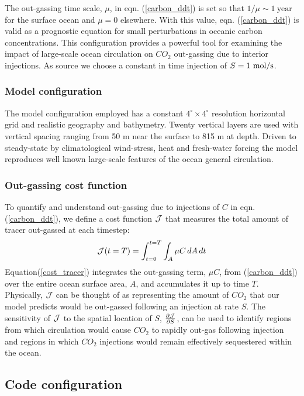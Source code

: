 The out-gassing time scale, $\mu$, in eqn. (\ref{carbon_ddt})
is set so that \( 1/\mu \sim 1 \ \mathrm{year} \) for the surface
ocean and $\mu=0$ elsewhere. With this value, eqn. (\ref{carbon_ddt})
is valid as a prognostic equation for small perturbations in oceanic 
carbon concentrations. This configuration provides a 
powerful tool for examining the impact of large-scale ocean circulation
on $ CO_2 $ out-gassing due to interior injections.
As source we choose a constant in time injection of 
$ S = 1 \,\, {\rm mol / s}$.

\subsubsection{Model configuration}

The model configuration employed has a constant 
$4^\circ \times 4^\circ$ resolution horizontal grid and realistic 
geography and bathymetry. Twenty vertical layers are used with 
vertical spacing ranging
from 50 m near the surface to 815 m at depth. 
Driven to steady-state by climatological wind-stress, heat and
fresh-water forcing the model reproduces well known large-scale
features of the ocean general circulation. 

\subsubsection{Out-gassing cost function}

To quantify and understand out-gassing due to injections of $C$
in eqn. (\ref{carbon_ddt}),
we define a cost function $ {\cal J} $ that measures the total amount of 
tracer out-gassed at each timestep:
%
\begin{equation}
\label{cost_tracer}
{\cal J}(t=T)=\int_{t=0}^{t=T}\int_{A} \mu C \, dA \, dt
\end{equation}
%
Equation(\ref{cost_tracer}) integrates the out-gassing term, $\mu C$, 
from (\ref{carbon_ddt})
over the entire ocean surface area, $A$, and accumulates it 
up to time $T$.
Physically, ${\cal J}$ can be thought of as representing the amount of 
$CO_2$ that our model predicts would be out-gassed following an
injection at rate $S$.
The sensitivity of ${\cal J}$ to the spatial location of $S$, 
$\frac{\partial {\cal J}}{\partial S}$,
can be used to identify regions from which circulation
would cause $CO_2$ to rapidly out-gas following injection
and regions in which $CO_2$ injections would remain effectively 
sequestered within the ocean.

\subsection{Code configuration}

